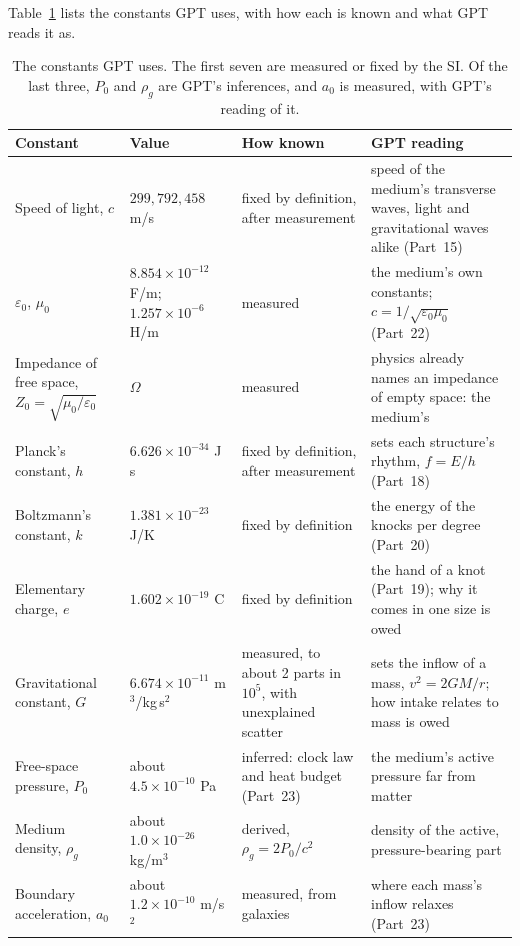 \documentclass[11pt,a4paper]{article}
\begin{document}
Table~\ref{tab:constants} lists the constants GPT uses, with how each is known and what GPT reads it as.

\begin{table}[tb]
\centering
\small
\renewcommand{\arraystretch}{1.25}
\begin{tabular}{@{}>{\raggedright\arraybackslash}p{}>{\raggedright\arraybackslash}p{}>{\raggedright\arraybackslash}p{}>{\raggedright\arraybackslash}p{}@{}}
\toprule
\textbf{Constant} & \textbf{Value} & \textbf{How known} & \textbf{GPT reading} \\
\midrule
Speed of light, $c$ & $299{,}792{,}458$ m/s & fixed by definition, after measurement & speed of the medium's transverse waves, light and gravitational waves alike (Part~15) \\
$\varepsilon_0$, $\mu_0$ & $8.854\times10^{-12}$ F/m; $1.257\times10^{-6}$ H/m & measured & the medium's own constants; $c=1/\sqrt{\varepsilon_0\mu_0}$ (Part~22) \\
Impedance of free space, $Z_0=\sqrt{\mu_0/\varepsilon_0}$ & 376.73 $\Omega$ & measured & physics already names an impedance of empty space: the medium's \\
Planck's constant, $h$ & $6.626\times10^{-34}$ J\,s & fixed by definition, after measurement & sets each structure's rhythm, $f=E/h$ (Part~18) \\
Boltzmann's constant, $k$ & $1.381\times10^{-23}$ J/K & fixed by definition & the energy of the knocks per degree (Part~20) \\
Elementary charge, $e$ & $1.602\times10^{-19}$ C & fixed by definition & the hand of a knot (Part~19); why it comes in one size is owed \\
Gravitational constant, $G$ & $6.674\times10^{-11}$ m$^3$/kg\,s$^2$ & measured, to about 2 parts in $10^5$, with unexplained scatter & sets the inflow of a mass, $v^2=2GM/r$; how intake relates to mass is owed \\
Free-space pressure, $P_0$ & about $4.5\times10^{-10}$ Pa & inferred: clock law and heat budget (Part~23) & the medium's active pressure far from matter \\
Medium density, $\rho_g$ & about $1.0\times10^{-26}$ kg/m$^3$ & derived, $\rho_g=2P_0/c^2$ & density of the active, pressure-bearing part \\
Boundary acceleration, $a_0$ & about $1.2\times10^{-10}$ m/s$^2$ & measured, from galaxies & where each mass's inflow relaxes (Part~23) \\
\bottomrule
\end{tabular}
\caption{The constants GPT uses. The first seven are measured or fixed by the SI. Of the last three, $P_0$ and $\rho_g$ are GPT's inferences, and $a_0$ is measured, with GPT's reading of it.}
\label{tab:constants}
\end{table}
\end{document}
